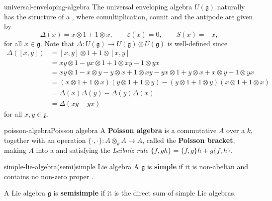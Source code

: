 \begin{example}{universal-enveloping-algebra}
    The universal enveloping algebra $U(\mathfrak{g})$ naturally has the structure of a , where comultiplication, counit and the antipode are given by
    \[ \Delta(x) = x \otimes 1 + 1 \otimes x, \qquad \varepsilon(x) = 0 , \qquad S(x) = -x , \]
    for all $x \in \mathfrak{g}$. Note that $\Delta \colon U(\mathfrak{g}) \to U(\mathfrak{g}) \otimes U(\mathfrak{g})$ is well-defined since
    \[ \begin{aligned}
        \Delta([x, y])
            &= [x, y] \otimes 1 + 1 \otimes [x, y] \\
            &= xy \otimes 1 - yx \otimes 1 + 1 \otimes xy - 1 \otimes yx \\
            &= xy \otimes 1 - x \otimes y - y \otimes x + 1 \otimes xy - yx \otimes 1 + y \otimes x + x \otimes y - 1 \otimes yx \\
            &= (x \otimes 1 + 1 \otimes x)(y \otimes 1 + 1 \otimes y) - (y \otimes 1 + 1 \otimes y)(x \otimes 1 + 1 \otimes x) \\
            &= \Delta(x) \Delta(y) - \Delta(y) \Delta(x) \\
            &= \Delta(xy - yx)
    \end{aligned} \]
    for all $x, y \in \mathfrak{g}$.
\end{example}

\begin{topic}{poisson-algebra}{Poisson algebra}
    A \textbf{Poisson algebra} is a commutative  $A$ over a  $k$, together with an operation $\{ \cdot, \cdot \} \colon A \otimes_k A \to A$, called the \textbf{Poisson bracket}, making $A$ into a  and satisfying the \textit{Leibniz rule} $\{ f, gh \} = \{ f, g \} h + g \{ f, h \}$. %
\end{topic}

\begin{topic}{simple-lie-algebra}{(semi)simple Lie algebra}
    A  $\mathfrak{g}$ is \textbf{simple} if it is non-abelian and contains no non-zero proper .
    
    A Lie algebra $\mathfrak{g}$ is \textbf{semisimple} if it is the direct sum of simple Lie algebras.
\end{topic}

